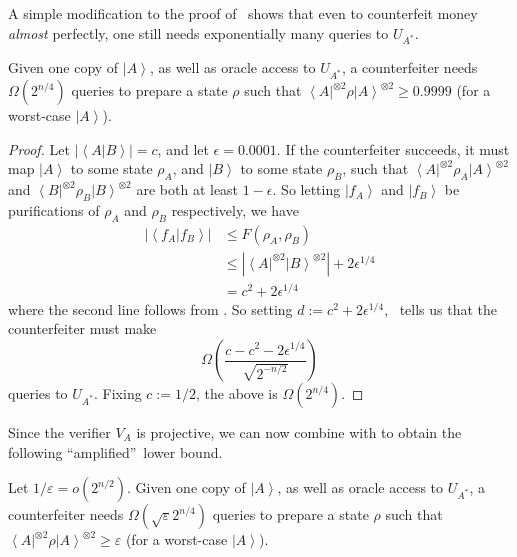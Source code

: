 A simple modification to the proof of \ shows that even
to counterfeit money \emph{almost} perfectly, one still needs exponentially
many queries to $U_{A^{\ast}}$.

\begin{corollary}
\label{smallerrror}Given one copy
of $\left\vert A\right\rangle $, as well as oracle access to $U_{A^{\ast}}$, a
counterfeiter needs $\Omega(  2^{n/4})  $ queries to prepare a
state $\rho$ such that $\left\langle A\right\vert ^{\otimes2}\rho\left\vert
A\right\rangle ^{\otimes2}\geq0.9999$ (for a worst-case $\left\vert
A\right\rangle $).
\end{corollary}

\begin{proof}
Let $\left\vert \left\langle A|B\right\rangle \right\vert =c$, and let
$\epsilon=0.0001$. If the counterfeiter succeeds, it must map $\left\vert
A\right\rangle $ to some state $\rho_{A}$, and $\left\vert B\right\rangle
$ to some state $\rho_{B}$, such that $\left\langle A\right\vert ^{\otimes
2}\rho_{A}\left\vert A\right\rangle ^{\otimes2}$ and $\left\langle
B\right\vert ^{\otimes2}\rho_{B}\left\vert B\right\rangle ^{\otimes2}$ are
both at least $1-\epsilon$. So letting $\left\vert f_{A}\right\rangle $ and
$\left\vert f_{B}\right\rangle $ be purifications of $\rho_{A}$ and
$\rho_{B}$ respectively, we have%
\begin{align*}
\left\vert \left\langle f_{A}|f_{B}\right\rangle \right\vert  &  \leq F\left(
\rho_{A},\rho_{B}\right)  \\
&  \leq\left\vert \left\langle A\right\vert ^{\otimes2}\left\vert
B\right\rangle ^{\otimes2}\right\vert +2\epsilon^{1/4}\\
&  =c^{2}+2\epsilon^{1/4}%
\end{align*}
where the second line follows from . So setting
$d:=c^{2}+2\epsilon^{1/4}$, \ tells us that the
counterfeiter must make%
\[
\Omega\left(  \frac{c-c^{2}-2\epsilon^{1/4}}{\sqrt{2^{-n/2}}}\right)
\]
queries to $U_{A^{\ast}}$. Fixing $c:=1/2$, the above is $\Omega\left(
2^{n/4}\right)  $.
\end{proof}

Since the verifier $V_{A}$ is projective, we can now combine  with  to obtain the following
\textquotedblleft amplified\textquotedblright\ lower bound.

\begin{corollary}
\label{largeerrror}Let
$1/\varepsilon=o\left(  2^{n/2}\right)  $. Given one copy of $\left\vert
A\right\rangle $, as well as oracle access to $U_{A^{\ast}}$, a counterfeiter
needs $\Omega\left(  \sqrt{\varepsilon}2^{n/4}\right)  $ queries to prepare a
state $\rho$ such that $\left\langle A\right\vert ^{\otimes2}\rho\left\vert
A\right\rangle ^{\otimes2}\geq\varepsilon$ (for a worst-case $\left\vert
A\right\rangle $).
\end{corollary}

